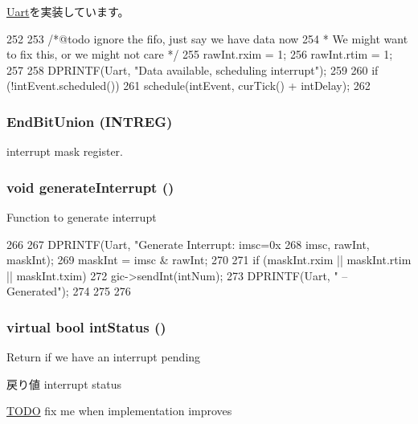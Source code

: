 \hyperlink{classUart_a8e0026e4db90ce7efbddf2835f411b0b}{Uart}を実装しています。


\begin{DoxyCode}
252 {
253     /*@todo ignore the fifo, just say we have data now
254      * We might want to fix this, or we might not care */
255     rawInt.rxim = 1;
256     rawInt.rtim = 1;
257 
258     DPRINTF(Uart, "Data available, scheduling interrupt\n");
259 
260     if (!intEvent.scheduled())
261         schedule(intEvent, curTick() + intDelay);
262 }
\end{DoxyCode}
\hypertarget{classPl011_a0b479d35b44ed7045fe0849fc06ee395}{
\subsubsection[{EndBitUnion}]{\setlength{\rightskip}{0pt plus 5cm}EndBitUnion (INTREG)}}
\label{classPl011_a0b479d35b44ed7045fe0849fc06ee395}
interrupt mask register. \hypertarget{classPl011_ab251ef5c4d9e1f0239542a9d8aa0dc3e}{
\subsubsection[{generateInterrupt}]{\setlength{\rightskip}{0pt plus 5cm}void generateInterrupt ()}}
\label{classPl011_ab251ef5c4d9e1f0239542a9d8aa0dc3e}
Function to generate interrupt 


\begin{DoxyCode}
266 {
267     DPRINTF(Uart, "Generate Interrupt: imsc=0x%
268             imsc, rawInt, maskInt);
269     maskInt = imsc & rawInt;
270 
271     if (maskInt.rxim || maskInt.rtim || maskInt.txim) {
272         gic->sendInt(intNum);
273         DPRINTF(Uart, " -- Generated\n");
274     }
275 
276 }
\end{DoxyCode}
\hypertarget{classPl011_a57f9c26cb4108beccb35bb1938990932}{
\subsubsection[{intStatus}]{\setlength{\rightskip}{0pt plus 5cm}virtual bool intStatus ()}}
\label{classPl011_a57f9c26cb4108beccb35bb1938990932}
Return if we have an interrupt pending \begin{DoxyReturn}{戻り値}
interrupt status 
\end{DoxyReturn}
\begin{Desc}
\item[\hyperlink{todo__todo000056}{TODO}]fix me when implementation improves \end{Desc}


